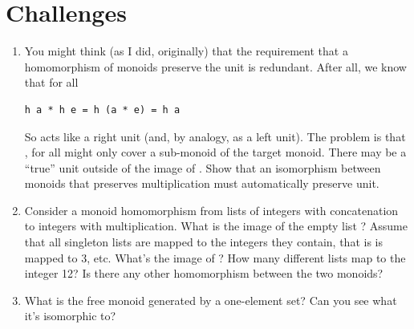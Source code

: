 \section{Challenges}\label{challenges}

\begin{enumerate}
\tightlist
\item
  You might think (as I did, originally) that the requirement that a
  homomorphism of monoids preserve the unit is redundant. After all, we
  know that for all 

\begin{Verbatim}[commandchars=\\\{\}]
h a * h e = h (a * e) = h a
\end{Verbatim}
  So  acts like a right unit (and, by analogy, as a left
  unit). The problem is that , for all  might
  only cover a sub-monoid of the target monoid. There may be a ``true''
  unit outside of the image of . Show that an isomorphism
  between monoids that preserves multiplication must automatically
  preserve unit.
\item
  Consider a monoid homomorphism from lists of integers with
  concatenation to integers with multiplication. What is the image of
  the empty list \code{{[}{]}}? Assume that all singleton lists are
  mapped to the integers they contain, that is \code{{[}3{]}} is
  mapped to 3, etc. What's the image of \code{{[}1, 2, 3, 4{]}}?
  How many different lists map to the integer 12? Is there any other
  homomorphism between the two monoids?
\item
  What is the free monoid generated by a one-element set? Can you see
  what it's isomorphic to?
\end{enumerate}